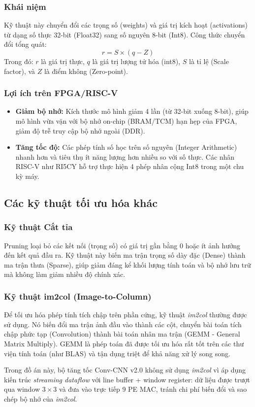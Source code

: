 \subsubsection{Khái niệm}
Kỹ thuật này chuyển đổi các trọng số (weights) và giá trị kích hoạt (activations) từ dạng số thực 32-bit (Float32) sang số nguyên 8-bit (Int8). Công thức chuyển đổi tổng quát:
\begin{equation}
r = S \times (q - Z)
\end{equation}
Trong đó: $r$ là giá trị thực, $q$ là giá trị lượng tử hóa (int8), $S$ là tỉ lệ (Scale factor), và $Z$ là điểm không (Zero-point).

\subsubsection{Lợi ích trên FPGA/RISC-V}
\begin{itemize}
    \item \textbf{Giảm bộ nhớ:} Kích thước mô hình giảm 4 lần (từ 32-bit xuống 8-bit), giúp mô hình vừa vặn với bộ nhớ on-chip (BRAM/TCM) hạn hẹp của FPGA, giảm độ trễ truy cập bộ nhớ ngoài (DDR).
    \item \textbf{Tăng tốc độ:} Các phép tính số học trên số nguyên (Integer Arithmetic) nhanh hơn và tiêu thụ ít năng lượng hơn nhiều so với số thực. Các nhân RISC-V như RI5CY hỗ trợ thực hiện 4 phép nhân cộng Int8 trong một chu kỳ máy.
\end{itemize}

\subsection{Các kỹ thuật tối ưu hóa khác}

\subsubsection{Kỹ thuật Cắt tỉa }
Pruning loại bỏ các kết nối (trọng số) có giá trị gần bằng 0 hoặc ít ảnh hưởng đến kết quả đầu ra. Kỹ thuật này biến ma trận trọng số dày đặc (Dense) thành ma trận thưa (Sparse), giúp giảm đáng kể khối lượng tính toán và bộ nhớ lưu trữ mà không làm giảm nhiều độ chính xác.

\subsubsection{Kỹ thuật im2col (Image-to-Column)}

Để tối ưu hóa phép tính tích chập trên phần cứng, kỹ thuật \textit{im2col} thường được sử dụng. Nó biến đổi ma trận ảnh đầu vào thành các cột, chuyển bài toán tích chập phức tạp (Convolution) thành bài toán nhân ma trận (GEMM - General Matrix Multiply). GEMM là phép toán đã được tối ưu hóa rất tốt trên các thư viện tính toán (như BLAS) và tận dụng triệt để khả năng xử lý song song.

Trong đồ án này, bộ tăng tốc Conv-CNN v2.0 không sử dụng \textit{im2col} vì áp dụng kiến trúc \textit{streaming dataflow} với line buffer + window register: dữ liệu được trượt qua window $3 \times 3$ và đưa vào trực tiếp 9 PE MAC, tránh chi phí biến đổi và sao chép bộ nhớ của \textit{im2col}.
